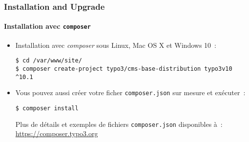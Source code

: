 
\begin{frame}[fragile]
	\frametitle{Installation and Upgrade}
	\framesubtitle{Installation avec \texttt{composer}}

	\begin{itemize}
		\item Installation avec \textit{composer} sous Linux, Mac OS X et Windows 10~:

			\begin{lstlisting}
$ cd /var/www/site/
$ composer create-project typo3/cms-base-distribution typo3v10 ^10.1
			\end{lstlisting}

		\item Vous pouvez aussi créer votre ficher \texttt{composer.json} sur mesure
			et exécuter~:

			\begin{lstlisting}
$ composer install
			\end{lstlisting}

			Plus de détails et exemples de fichiers \texttt{composer.json} disponibles à~:\newline
			\smaller
				\href{https://composer.typo3.org}{https://composer.typo3.org}
			\normalsize

	\end{itemize}
\end{frame}

